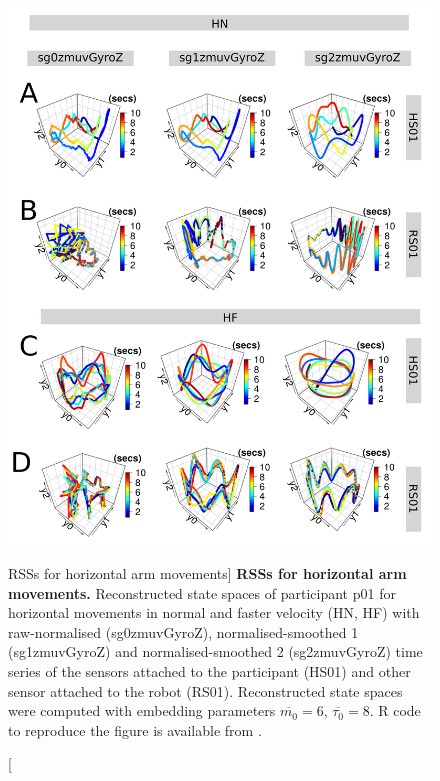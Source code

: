 \begin{figure}
\centering
\includegraphics[height=0.85\textheight]{fig_6_04}
\caption
	[RSSs for horizontal arm movements]{
	{\bf RSSs for horizontal arm movements.}
	Reconstructed state spaces %
	of participant p01 for horizontal movements in normal and faster 
	velocity (HN, HF) with raw-normalised (sg0zmuvGyroZ), 
	normalised-smoothed 1 (sg1zmuvGyroZ) and 
	normalised-smoothed 2 (sg2zmuvGyroZ) time series of the 
	sensors attached to the participant (HS01) and other sensor 
	attached to the robot (RS01).	
	Reconstructed state spaces were computed with 
	embedding parameters $\overline{m_0}=6$, $\overline{\tau_0}=8$.
	R code to reproduce the figure is available from \cite{hwum2018}.
        }
    \label{fig:rss_aHw10}
\end{figure}

